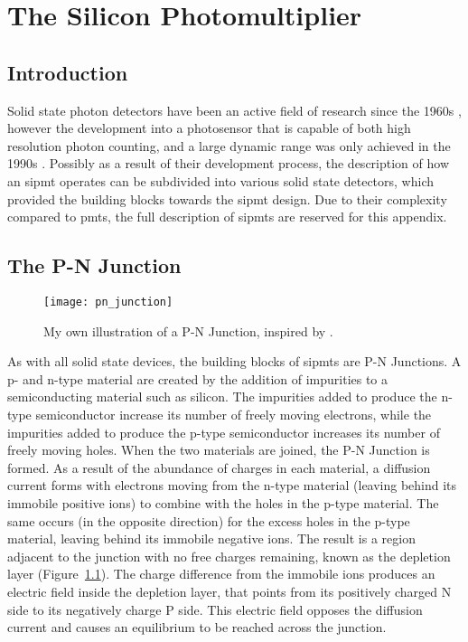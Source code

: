 \chapter{\label{a1-sipm}The Silicon Photomultiplier}

\minitoc

\section{Introduction}

Solid state photon detectors have been an active field of research since the 1960s \cite{Renker2006}, however the development into a photosensor that is capable of both high resolution photon counting, and a large dynamic range was only achieved in the 1990s \cite{Otte2006}. Possibly as a result of their development process, the description of how an \gls{sipmt} operates can be subdivided into various solid state detectors, which provided the building blocks towards the \gls{sipmt} design. Due to their complexity compared to \glspl{pmt}, the full description of \glspl{sipmt} are reserved for this appendix.

\section{The P-N Junction}

\begin{figure}
	\centering
    \texttt{[image: pn\_junction]} 
	\caption[A typical illustration of a P-N Junction.]{My own illustration of a P-N Junction, inspired by \textcite{Ghassemi2017}.}
	\label{fig:pn_junction}
\end{figure}

As with all solid state devices, the building blocks of \glspl{sipmt} are P-N Junctions. A p- and n-type material are created by the addition of impurities to a semiconducting material such as silicon. The impurities added to produce the n-type semiconductor increase its number of freely moving electrons, while the impurities added to produce the p-type semiconductor increases its number of freely moving holes. When the two materials are joined, the P-N Junction is formed. As a result of the abundance of charges in each material, a diffusion current forms with electrons moving from the n-type material (leaving behind its immobile positive ions) to combine with the holes in the p-type material. The same occurs (in the opposite direction) for the excess holes in the p-type material, leaving behind its immobile negative ions. The result is a region adjacent to the junction with no free charges remaining, known as the depletion layer (Figure~\ref{fig:pn_junction}). The charge difference from the immobile ions  produces an electric field inside the depletion layer, that points from its positively charged N side to its negatively charge P side. This electric field opposes the diffusion current and causes an equilibrium to be reached across the junction.

